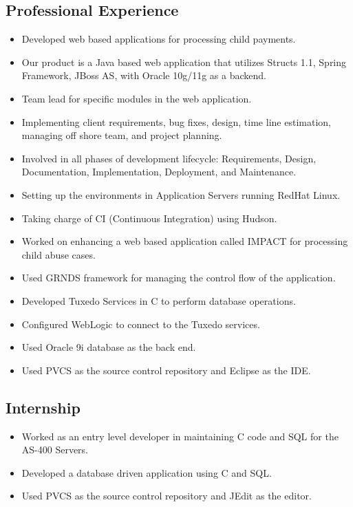 \documentclass[11pt,letterpaper,sans]{moderncv} %
\begin{document}
  \subsection{Professional Experience}
     {\begin{itemize}
         \item Developed web based applications for processing child payments.
         \item Our product is a Java based web application that utilizes Structs 1.1, Spring Framework, JBoss AS, with Oracle 10g/11g as a backend.
         \item Team lead for specific modules in the web application.
         \item Implementing client requirements, bug fixes, design, time line estimation, managing off shore team, and project planning.
         \item Involved in all phases of development lifecycle: Requirements, Design, Documentation, Implementation, Deployment, and Maintenance.
         \item Setting up the environments in Application Servers running RedHat Linux.
         \item Taking charge of CI (Continuous Integration) using Hudson.
     \end{itemize}}
     
     {\begin{itemize}
         \item Worked on enhancing a web based application called IMPACT for processing child abuse cases.
         \item Used GRNDS framework for managing the control flow of the application.
         \item Developed Tuxedo Services in C to perform database operations.
         \item Configured WebLogic to connect to the Tuxedo services.
         \item Used Oracle 9i database as the back end.
         \item Used PVCS as the source control repository and Eclipse as the IDE.
     \end{itemize}}

  \subsection{Internship}
     {\begin{itemize}
         \item Worked as an entry level developer in maintaining C code and SQL for the AS-400 Servers.
         \item Developed a database driven application using C and SQL.
         \item Used PVCS as the source control repository and JEdit as the editor.
     \end{itemize}}
  
\end{document}
